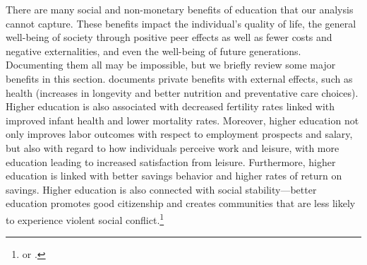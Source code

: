 \noindent There are many social and non-monetary benefits of education that our analysis cannot capture. These benefits impact the individual's quality of life, the general well-being of society through positive peer effects as well as fewer costs and negative externalities, and even the well-being of future generations. Documenting them all may be impossible, but we briefly review some major benefits in this section. \cite{Vila_2000_Non-Monetary-Benefits-Education} documents private benefits with external effects, such as health (increases in longevity and better nutrition and preventative care choices). Higher education is also associated with decreased fertility rates linked with improved infant health and lower mortality rates. Moreover, higher education not only improves labor outcomes with respect to employment prospects and salary, but also with regard to how individuals perceive work and leisure, with more education leading to increased satisfaction from leisure. Furthermore, higher education is linked with better savings behavior and higher rates of return on savings. Higher education is also connected with social stability---better education promotes good citizenship and creates communities that are less likely to experience violent social conflict.\footnote{\citet{Lochner_2011_Handbook} or \citet{Lochner_2011_NBER}.}